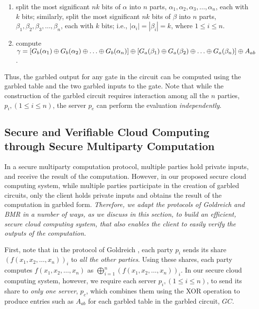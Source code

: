 \documentclass[10pt,journal,cspaper,compsoc]{IEEEtran}
\begin{document}
\begin{enumerate}
    \item{split the most significant $nk$ bits of $\alpha$ into $n$ parts, $\alpha_1, \alpha_2, \alpha_3, \ldots, \alpha_n$, each with $k$ bits; similarly, split the most significant $nk$ bits of $\beta$ into $n$ parts, $\beta_1, \beta_2, \beta_3, \ldots, \beta_n$, each with $k$ bits; i.e., $|\alpha_i| = |\beta_i| = k$, where $1\le i\le n$.}

    \item{compute $\gamma = [G_b(\alpha_1)\oplus G_b(\alpha_2)\oplus \ldots \oplus G_b(\alpha_n)]\\\oplus [G_a(\beta_1)\oplus G_a(\beta_2)\oplus \ldots \oplus G_a(\beta_n)]\oplus A_{ab}$.}\end{enumerate}

Thus, the garbled output for any gate in the circuit can be computed using the garbled table and the two garbled inputs to the gate. Note that while the construction of the garbled circuit requires interaction among all the $n$ parties, $p_i,(1\le i\le n)$, the server $p_e$ can perform the evaluation {\em independently}.


\subsection{Secure and Verifiable Cloud Computing through Secure Multiparty Computation}
\label{sec_key_changes_to_BMR_Goldreich}

In a secure multiparty computation protocol, multiple parties hold private inputs, and receive the result of the computation. However, in our proposed secure cloud computing system, while multiple parties participate in the creation of garbled circuits, only the client holds private inputs and obtains the result of the computation in garbled form. {\em Therefore, we adapt the protocols of Goldreich and BMR in a number of ways, as we discuss in this section, to build an efficient, secure cloud computing system, that also enables the client to easily verify the outputs of the computation.}


First, note that in the protocol of Goldreich \cite{goldreich04,goldreich87}, each party $p_i$ sends its share $(f(x_1, x_2, \ldots, x_n))_i$ to {\em all the other parties}. Using these shares, each party computes $f(x_1, x_2, \ldots, x_n)$ as $\bigoplus_{i = 1}^n (f(x_1, x_2, \ldots, x_n))_i$. In our secure cloud computing system, however, we require each server $p_i, (1\le i\le n)$, to send its share to {\em only one server}, $p_c$, which combines them using the XOR operation to produce entries such as $A_{ab}$ for each garbled table in the garbled circuit, $GC$.
\end{document}
